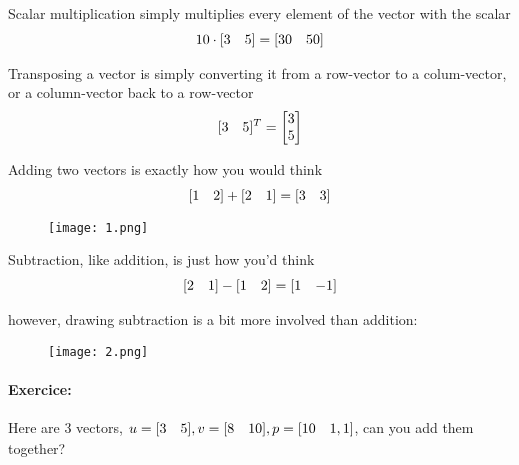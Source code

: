 \documentclass{article}
\begin{document}
\begin{itemize}
\item \color{rooj}  Scalar multiplication \color{black} simply multiplies every element of the vector with the scalar
\[
10 \cdot \begin{matrix}[3 & 5]\end{matrix} = \begin{matrix}[30 & 50]\end{matrix}
\]
\item

 \color{pers} Transposing \color{black} a vector is simply converting it from a row-vector to a colum-vector, or a column-vector back to a row-vector
\[
\begin{matrix}[3 & 5]\end{matrix}^T = \left[\begin{matrix}3 \\ 5\end{matrix}\right]
\]


\begin{minipage}{0.45\textwidth}
\item \color{groen} Adding \color{black} two vectors is exactly how you would think
\[
\begin{matrix}[1 & 2]\end{matrix} + \begin{matrix}[2 & 1]\end{matrix} = \begin{matrix}[3  & 3]\end{matrix}
\]
\end{minipage} \hfill
\begin{minipage}{0.45\textwidth}
\begin{flushleft}
\begin{figure}[H]
\texttt{[image: 1.png]}
\end{figure}
\end{flushleft}
\end{minipage}


\begin{minipage}{0.45\textwidth}
\item \color{blou} Subtraction\color{black}, like addition, is just how you'd think
\[
\begin{matrix}[2 & 1]\end{matrix} - \begin{matrix}[1  & 2]\end{matrix} = \begin{matrix}[1 & -1]\end{matrix}
\]

however, drawing subtraction is a bit more involved than addition:
\end{minipage} \hfill
\begin{minipage}{0.45\textwidth}
\begin{flushleft}
\begin{figure}[H]
\texttt{[image: 2.png]}
\end{figure}
\end{flushleft}
\end{minipage}

\end{itemize}

\paragraph{Exercice: } 
Here are 3 vectors, $u = \begin{matrix}[3 & 5]\end{matrix}, v = \begin{matrix}[8 & 10]\end{matrix}, p = \begin{matrix}[10& 1, 1]\end{matrix}$, can you add them together?
\end{document}
